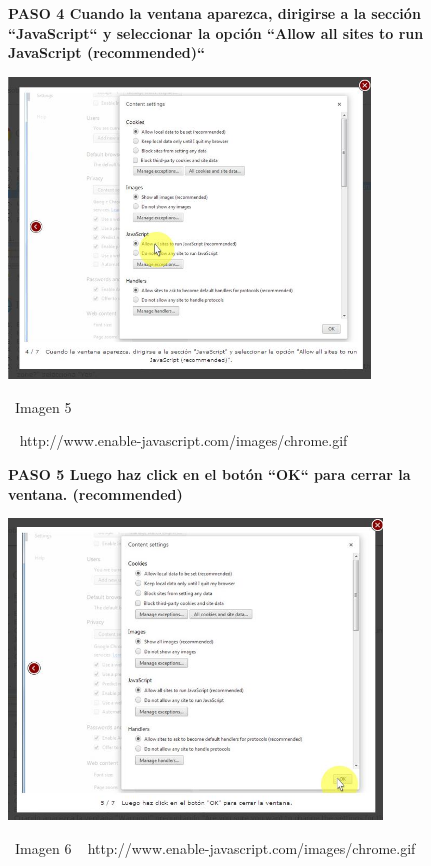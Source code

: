 \documentclass[11pt]{article} %
\begin{document}
\begin{figure}
\begin{center}
\begin{center}

\bf PASO 4
Cuando la ventana aparezca, dirigirse a la sección ``JavaScript``  y seleccionar la opción ``Allow all sites to run JavaScript (recommended)``
\newline


\includegraphics[height=8cm, width=8 cm] {imagenes/chrome 04.jpg}
\end{center}
\ Imagen 5

\ { http://www.enable-javascript.com/images/chrome.gif }

\begin{center}
\bf PASO 5
Luego haz click en el botón ``OK`` para cerrar la ventana. (recommended)
\newline


\includegraphics[height=8cm, width=8 cm] {imagenes/chrome 05.jpg}
\end{center}
\ Imagen 6
\ { http://www.enable-javascript.com/images/chrome.gif }
\newline
\end{center}
\end{figure}
\end{document}
